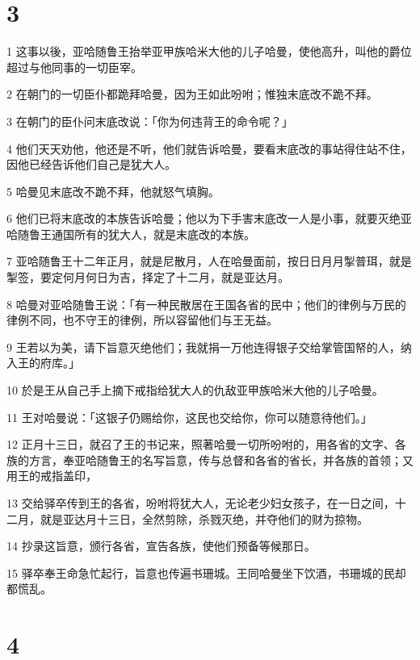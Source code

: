 \chapter{3}

\par 1 这事以後，亚哈随鲁王抬举亚甲族哈米大他的儿子哈曼，使他高升，叫他的爵位超过与他同事的一切臣宰。
\par 2 在朝门的一切臣仆都跪拜哈曼，因为王如此吩咐；惟独末底改不跪不拜。
\par 3 在朝门的臣仆问末底改说：「你为何违背王的命令呢？」
\par 4 他们天天劝他，他还是不听，他们就告诉哈曼，要看末底改的事站得住站不住，因他已经告诉他们自己是犹大人。
\par 5 哈曼见末底改不跪不拜，他就怒气填胸。
\par 6 他们已将末底改的本族告诉哈曼；他以为下手害末底改一人是小事，就要灭绝亚哈随鲁王通国所有的犹大人，就是末底改的本族。
\par 7 亚哈随鲁王十二年正月，就是尼散月，人在哈曼面前，按日日月月掣普珥，就是掣签，要定何月何日为吉，择定了十二月，就是亚达月。
\par 8 哈曼对亚哈随鲁王说：「有一种民散居在王国各省的民中；他们的律例与万民的律例不同，也不守王的律例，所以容留他们与王无益。
\par 9 王若以为美，请下旨意灭绝他们；我就捐一万他连得银子交给掌管国帑的人，纳入王的府库。」
\par 10 於是王从自己手上摘下戒指给犹大人的仇敌亚甲族哈米大他的儿子哈曼。
\par 11 王对哈曼说：「这银子仍赐给你，这民也交给你，你可以随意待他们。」
\par 12 正月十三日，就召了王的书记来，照著哈曼一切所吩咐的，用各省的文字、各族的方言，奉亚哈随鲁王的名写旨意，传与总督和各省的省长，并各族的首领；又用王的戒指盖印，
\par 13 交给驿卒传到王的各省，吩咐将犹大人，无论老少妇女孩子，在一日之间，十二月，就是亚达月十三日，全然剪除，杀戮灭绝，并夺他们的财为掠物。
\par 14 抄录这旨意，颁行各省，宣告各族，使他们预备等候那日。
\par 15 驿卒奉王命急忙起行，旨意也传遍书珊城。王同哈曼坐下饮酒，书珊城的民却都慌乱。

\chapter{4}

